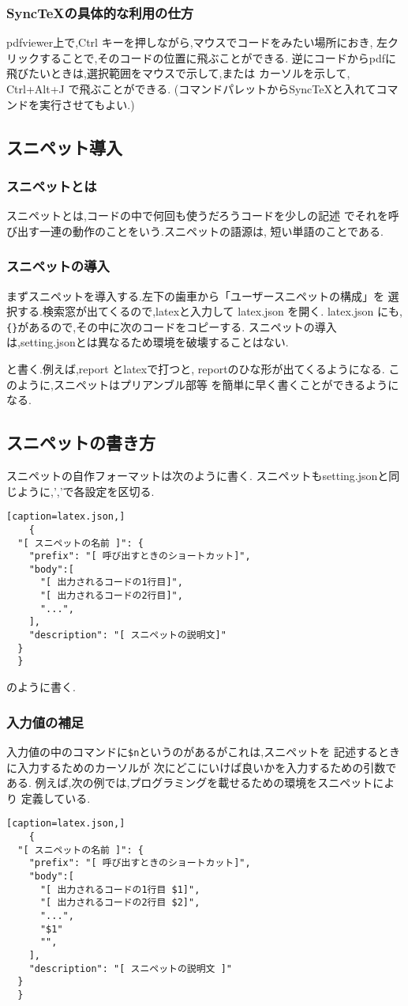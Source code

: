 \documentclass{ltjsarticle}
\begin{document}
\subsubsection*{SyncTeXの具体的な利用の仕方}
pdfviewer上で,Ctrl キーを押しながら,マウスでコードをみたい場所におき,
左クリックすることで,そのコードの位置に飛ぶことができる.
逆にコードからpdfに飛びたいときは,選択範囲をマウスで示して,または
カーソルを示して, Ctrl+Alt+J で飛ぶことができる.
(コマンドパレットからSyncTeXと入れてコマンドを実行させてもよい.)

\subsection{スニペット導入}
\subsubsection*{スニペットとは}
スニペットとは,コードの中で何回も使うだろうコードを少しの記述
でそれを呼び出す一連の動作のことをいう.スニペットの語源は,
短い単語のことである.
\subsubsection*{スニペットの導入}
まずスニペットを導入する.左下の歯車から「ユーザースニペットの構成」を
選択する.検索窓が出てくるので,latexと入力して latex.json を開く.
latex.json にも,\verb|{}|があるので,その中に次のコードをコピーする.
スニペットの導入は,setting.jsonとは異なるため環境を破壊することはない.


と書く.例えば,report とlatexで打つと,
reportのひな形が出てくるようになる.
このように,スニペットはプリアンブル部等
を簡単に早く書くことができるようになる.
\subsection{スニペットの書き方}
スニペットの自作フォーマットは次のように書く.
スニペットもsetting.jsonと同じように,','で各設定を区切る.
\begin{verbatim}[caption=latex.json,]
	{
  "[ スニペットの名前 ]": {
    "prefix": "[ 呼び出すときのショートカット]",
    "body":[
      "[ 出力されるコードの1行目]",
      "[ 出力されるコードの2行目]",
      "...",
    ],
    "description": "[ スニペットの説明文]"
  }
  }
\end{verbatim}
のように書く.
\subsubsection*{入力値の補足}
入力値の中のコマンドに\verb|$n|というのがあるがこれは,スニペットを
記述するときに入力するためのカーソルが
次にどこにいけば良いかを入力するための引数である.
例えば,次の例では,プログラミングを載せるための環境をスニペットにより
定義している.
\begin{verbatim}[caption=latex.json,]
	{
  "[ スニペットの名前 ]": {
    "prefix": "[ 呼び出すときのショートカット]",
    "body":[
      "[ 出力されるコードの1行目 $1]",
      "[ 出力されるコードの2行目 $2]",
      "...",
      "$1"
      "",
    ],
    "description": "[ スニペットの説明文 ]"
  }
  }
\end{verbatim}
\end{document}
